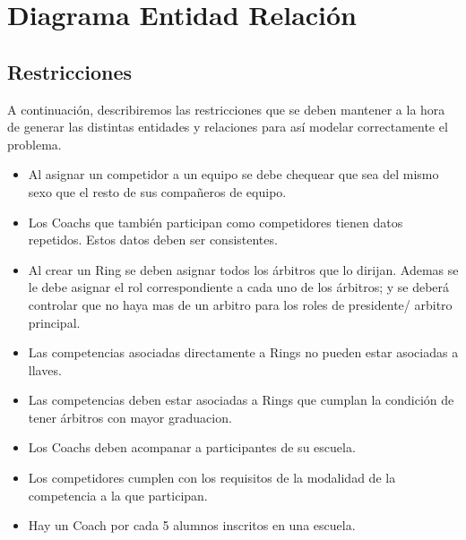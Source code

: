 \section{Diagrama Entidad Relaci\'on}

\subsection{Restricciones}


A continuación, describiremos las restricciones que se deben mantener a la hora de generar las distintas entidades y relaciones para así modelar correctamente el problema.

\begin{itemize}
\item Al asignar un competidor a un equipo se debe chequear que sea del mismo sexo que el resto de sus compañeros de equipo.
\item Los Coachs que también participan como competidores tienen datos repetidos. Estos datos deben ser consistentes.
\item Al crear un Ring se deben asignar todos los árbitros que lo dirijan. Ademas se le debe asignar el rol correspondiente a cada uno de los árbitros; y se deberá controlar que no haya mas de un arbitro para los roles de presidente/ arbitro principal. %
\item Las competencias asociadas directamente a Rings no pueden estar asociadas a llaves.
\item Las competencias deben estar asociadas a Rings que cumplan la condición de tener árbitros con mayor graduacion.
\item Los Coachs deben acompanar a participantes de su escuela.
\item Los competidores cumplen con los requisitos de la modalidad de la competencia a la que participan.
\item Hay un Coach por cada 5 alumnos inscritos en una escuela.
\end{itemize}